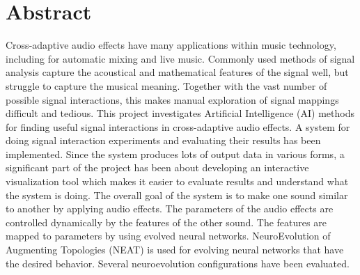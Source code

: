 \section*{Abstract}
Cross-adaptive audio effects have many applications within music technology, including for automatic mixing and live music. Commonly used methods of signal analysis capture the acoustical and mathematical features of the signal well, but struggle to capture the musical meaning. Together with the vast number of possible signal interactions, this makes manual exploration of signal mappings difficult and tedious. This project investigates Artificial Intelligence (AI) methods for finding useful signal interactions in cross-adaptive audio effects. A system for doing signal interaction experiments and evaluating their results has been implemented. Since the system produces lots of output data in various forms, a significant part of the project has been about developing an interactive visualization tool which makes it easier to evaluate results and understand what the system is doing. The overall goal of the system is to make one sound similar to another by applying audio effects. The parameters of the audio effects are controlled dynamically by the features of the other sound. The features are mapped to parameters by using evolved neural networks. NeuroEvolution of Augmenting Topologies (NEAT) is used for evolving neural networks that have the desired behavior. Several neuroevolution configurations have been evaluated.

